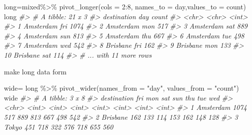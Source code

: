 \documentclass[
]{article}
\newenvironment{Shaded}{\begin{snugshade}}{\end{snugshade}}
\newcommand{\AttributeTok}[1]{\textcolor[rgb]{0.77,0.63,0.00}{#1}}
\newcommand{\CommentTok}[1]{\textcolor[rgb]{0.56,0.35,0.01}{\textit{#1}}}
\newcommand{\DecValTok}[1]{\textcolor[rgb]{0.00,0.00,0.81}{#1}}
\newcommand{\FunctionTok}[1]{\textcolor[rgb]{0.00,0.00,0.00}{#1}}
\newcommand{\NormalTok}[1]{#1}
\newcommand{\OtherTok}[1]{\textcolor[rgb]{0.56,0.35,0.01}{#1}}
\newcommand{\SpecialCharTok}[1]{\textcolor[rgb]{0.00,0.00,0.00}{#1}}
\newcommand{\StringTok}[1]{\textcolor[rgb]{0.31,0.60,0.02}{#1}}
\begin{document}
\begin{Shaded}
\begin{Highlighting}[]
\NormalTok{long}\OtherTok{=}\NormalTok{mixed}\SpecialCharTok{\%\textgreater{}\%}
  \FunctionTok{pivot\_longer}\NormalTok{(}\AttributeTok{cols =} \DecValTok{2}\SpecialCharTok{:}\DecValTok{8}\NormalTok{, }\AttributeTok{names\_to =} \StringTok{\textquotesingle{}day\textquotesingle{}}\NormalTok{,}\AttributeTok{values\_to =} \StringTok{\textquotesingle{}count\textquotesingle{}}\NormalTok{)}
\NormalTok{long}
\CommentTok{\#\textgreater{} \# A tibble: 21 x 3}
\CommentTok{\#\textgreater{}    destination day   count}
\CommentTok{\#\textgreater{}    \textless{}chr\textgreater{}       \textless{}chr\textgreater{} \textless{}int\textgreater{}}
\CommentTok{\#\textgreater{}  1 Amsterdam   fri    1074}
\CommentTok{\#\textgreater{}  2 Amsterdam   mon     517}
\CommentTok{\#\textgreater{}  3 Amsterdam   sat     889}
\CommentTok{\#\textgreater{}  4 Amsterdam   sun     813}
\CommentTok{\#\textgreater{}  5 Amsterdam   thu     667}
\CommentTok{\#\textgreater{}  6 Amsterdam   tue     498}
\CommentTok{\#\textgreater{}  7 Amsterdam   wed     542}
\CommentTok{\#\textgreater{}  8 Brisbane    fri     162}
\CommentTok{\#\textgreater{}  9 Brisbane    mon     133}
\CommentTok{\#\textgreater{} 10 Brisbane    sat     114}
\CommentTok{\#\textgreater{} \# ... with 11 more rows}
\end{Highlighting}
\end{Shaded}

make long data form

\begin{Shaded}
\begin{Highlighting}[]
\NormalTok{wide}\OtherTok{=}\NormalTok{ long }\SpecialCharTok{\%\textgreater{}\%} 
  \FunctionTok{pivot\_wider}\NormalTok{(}\AttributeTok{names\_from =} \StringTok{"day"}\NormalTok{, }\AttributeTok{values\_from =} \StringTok{"count"}\NormalTok{)}
\NormalTok{wide}
\CommentTok{\#\textgreater{} \# A tibble: 3 x 8}
\CommentTok{\#\textgreater{}   destination   fri   mon   sat   sun   thu   tue   wed}
\CommentTok{\#\textgreater{}   \textless{}chr\textgreater{}       \textless{}int\textgreater{} \textless{}int\textgreater{} \textless{}int\textgreater{} \textless{}int\textgreater{} \textless{}int\textgreater{} \textless{}int\textgreater{} \textless{}int\textgreater{}}
\CommentTok{\#\textgreater{} 1 Amsterdam    1074   517   889   813   667   498   542}
\CommentTok{\#\textgreater{} 2 Brisbane      162   133   114   153   162   148   128}
\CommentTok{\#\textgreater{} 3 Tokyo         451   718   322   576   718   655   560}
\end{Highlighting}
\end{Shaded}
\end{document}
